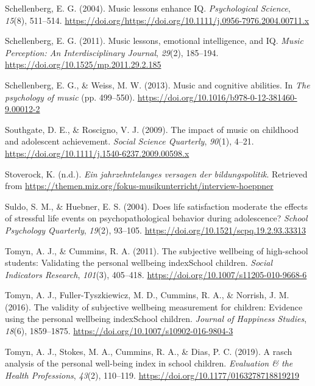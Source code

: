 \documentclass[a4, 12pt]{article}
\begin{document}
\leavevmode\hypertarget{ref-Schellenberg2004}{}%
Schellenberg, E. G. (2004). Music lessons enhance IQ. \emph{Psychological Science}, \emph{15}(8), 511--514. \url{https://doi.org/https://doi.org/10.1111/j.0956-7976.2004.00711.x}

\leavevmode\hypertarget{ref-Schellenberg2011a}{}%
Schellenberg, E. G. (2011). Music lessons, emotional intelligence, and IQ. \emph{Music Perception: An Interdisciplinary Journal}, \emph{29}(2), 185--194. \url{https://doi.org/10.1525/mp.2011.29.2.185}

\leavevmode\hypertarget{ref-Schellenberg2013}{}%
Schellenberg, E. G., \& Weiss, M. W. (2013). Music and cognitive abilities. In \emph{The psychology of music} (pp. 499--550). \url{https://doi.org/10.1016/b978-0-12-381460-9.00012-2}

\leavevmode\hypertarget{ref-Southgate2009}{}%
Southgate, D. E., \& Roscigno, V. J. (2009). The impact of music on childhood and adolescent achievement. \emph{Social Science Quarterly}, \emph{90}(1), 4--21. \url{https://doi.org/10.1111/j.1540-6237.2009.00598.x}

\leavevmode\hypertarget{ref-Stoverock}{}%
Stoverock, K. (n.d.). \emph{Ein jahrzehntelanges versagen der bildungspolitik}. Retrieved from \url{https://themen.miz.org/fokus-musikunterricht/interview-hoeppner}

\leavevmode\hypertarget{ref-Suldo2004}{}%
Suldo, S. M., \& Huebner, E. S. (2004). Does life satisfaction moderate the effects of stressful life events on psychopathological behavior during adolescence? \emph{School Psychology Quarterly}, \emph{19}(2), 93--105. \url{https://doi.org/10.1521/scpq.19.2.93.33313}

\leavevmode\hypertarget{ref-Tomyn2011a}{}%
Tomyn, A. J., \& Cummins, R. A. (2011). The subjective wellbeing of high-school students: Validating the personal wellbeing indexSchool children. \emph{Social Indicators Research}, \emph{101}(3), 405--418. \url{https://doi.org/10.1007/s11205-010-9668-6}

\leavevmode\hypertarget{ref-Tomyn2016}{}%
Tomyn, A. J., Fuller-Tyszkiewicz, M. D., Cummins, R. A., \& Norrish, J. M. (2016). The validity of subjective wellbeing measurement for children: Evidence using the personal wellbeing indexSchool children. \emph{Journal of Happiness Studies}, \emph{18}(6), 1859--1875. \url{https://doi.org/10.1007/s10902-016-9804-3}

\leavevmode\hypertarget{ref-Tomyn2019}{}%
Tomyn, A. J., Stokes, M. A., Cummins, R. A., \& Dias, P. C. (2019). A rasch analysis of the personal well-being index in school children. \emph{Evaluation \& the Health Professions}, \emph{43}(2), 110--119. \url{https://doi.org/10.1177/0163278718819219}
\end{document}
